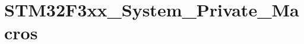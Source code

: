 \hypertarget{group___s_t_m32_f3xx___system___private___macros}{
\section{STM32F3xx\_\-System\_\-Private\_\-Macros}
\label{group___s_t_m32_f3xx___system___private___macros}
}
